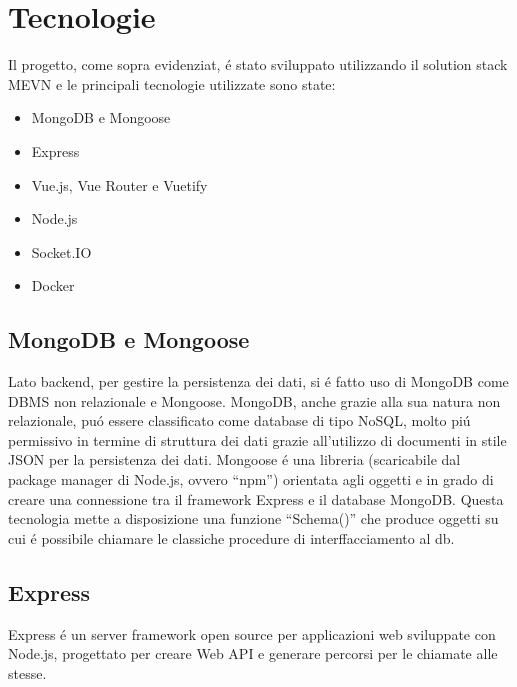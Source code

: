 \documentclass{report}
\begin{document}
\newpage

\section{Tecnologie}
Il progetto, come sopra evidenziat, é stato sviluppato utilizzando il solution stack MEVN e le principali tecnologie utilizzate sono state:
\begin{itemize}
    \item MongoDB e Mongoose
    \item Express
    \item Vue.js, Vue Router e Vuetify
    \item Node.js
    \item Socket.IO
    \item Docker
\end{itemize}

\subsection{MongoDB e Mongoose}
Lato backend, per gestire la persistenza dei dati, si é fatto uso di MongoDB come DBMS non relazionale e Mongoose.
\newline \newline
MongoDB, anche grazie alla sua natura non relazionale, puó essere classificato come database di tipo NoSQL, molto piú permissivo in termine di struttura dei dati grazie all’utilizzo di documenti in stile JSON per la persistenza dei dati.
\newline \newline
Mongoose é una libreria (scaricabile dal package manager di Node.js, ovvero “npm”) orientata agli oggetti e in grado di creare una connessione tra il framework Express e il database MongoDB. Questa tecnologia mette a disposizione una funzione “Schema()” che produce oggetti su cui é possibile chiamare le classiche procedure di interffacciamento al db.

\subsection{Express}
Express é un server framework open source per applicazioni web sviluppate con Node.js, progettato per creare Web API e generare percorsi per le chiamate alle stesse.
\end{document}
